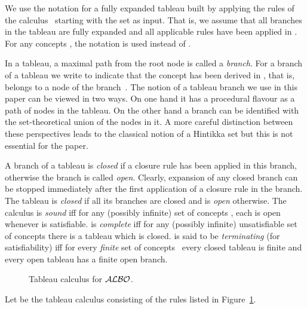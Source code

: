 \documentclass[leqno
,pdflatex
,prodmode
,acmtocl
]{acmsmall}
\newcommand{\mathcmd}[1]{\ensuremath{#1}\xspace}
\newcommand{\dlfont}{\mathcal}
\newcommand{\dl}[1]{\mathcmd{\dlfont{#1}}}
\newcommand{\ALBOid}{\dl{ALBO\smash[t]{\mbox{}}}}
\begin{document}
We use the notation  for a fully expanded tableau built
by applying the rules of the calculus~ starting with the set
 as input.
That is, we assume that all branches in the tableau are fully expanded and
all applicable rules have been applied in .
For any concepts , the notation 
is used instead of .

In a tableau, a maximal path from the root node is called a
\emph{branch}.
For  a branch of a tableau we write 
to indicate that the concept  has
been derived in , that is,  belongs to a node of the
branch~.
The notion of a tableau branch we use in this paper can be viewed
in two ways.
On one hand it has a procedural flavour as a path of nodes in the
tableau.
On the other hand a branch can be identified with the
set-theoretical union of the nodes in it.
A more careful distinction between these perspectives leads to the classical
notion of a Hintikka set but this is not essential for the paper.

A branch of a tableau is \emph{closed} if a closure rule has been applied
in this branch, otherwise the branch is called \emph{open}.
Clearly, expansion of any closed branch can be stopped immediately after
the first application of a closure rule in the branch.
The tableau  is \emph{closed} if all its branches are
closed and  is \emph{open} otherwise.
The calculus  is \emph{sound} iff
for any (possibly infinite)
set of concepts
, each  is open whenever  is satisfiable.
 is \emph{complete} iff for any (possibly infinite) unsatisfiable set of concepts
 there is a tableau  which is closed.
 is said to be \emph{terminating} (for satisfiability) iff 
for every \emph{finite} set of concepts~
every closed tableau  is finite and
every open tableau  has a finite open branch.

\begin{figure}[!tb]

\caption{Tableau calculus  for \ALBOid.}\label{table: T}
\end{figure}

Let  be the tableau calculus consisting of the rules listed
in Figure~\ref{table: T}.
\end{document}
